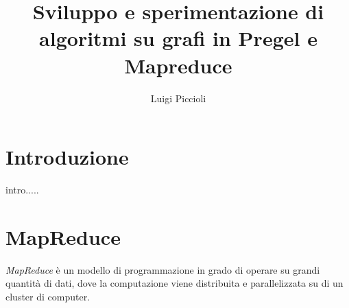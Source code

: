 \documentclass[LaM,binding=0.6cm]{sapthesis}
\title{Sviluppo e sperimentazione di algoritmi su grafi in Pregel e Mapreduce}
\author{Luigi Piccioli}
\begin{document}
\frontmatter

\maketitle


%

\tableofcontents

%
%
%
%
%
%




\mainmatter

\chapter{Introduzione}

intro.....


\chapter{MapReduce}

\textit{MapReduce} \cite{Dean:2008:MSD:1327452.1327492} è un modello di  programmazione in grado di operare su grandi quantità di dati, dove la computazione viene distribuita e parallelizzata su di un cluster di computer.
\end{document}
